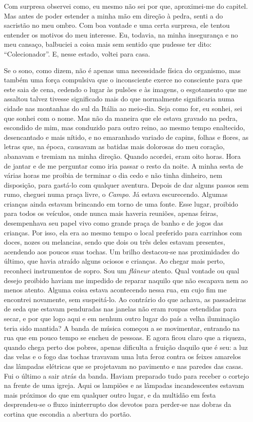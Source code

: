 Com surpresa observei como, eu mesmo não sei por que, aproximei-me do
capitel. Mas antes de poder estender a minha mão em direção à pedra,
senti a do sacristão no meu ombro. Com boa vontade e uma certa surpresa,
ele tentou entender os motivos do meu interesse. Eu, todavia, na minha
insegurança e no meu cansaço, balbuciei a coisa mais sem sentido que
pudesse ter dito: ``Colecionador''. E, nesse estado, voltei para casa.

Se o sono, como dizem, não é apenas uma necessidade física do organismo,
mas também uma força compulsiva que o inconsciente exerce no consciente
para que este saia de cena, cedendo o lugar às pulsões e às imagens, o
esgotamento que me assaltou talvez tivesse significado mais do que
normalmente significaria numa cidade nas montanhas do sul da Itália ao
meio-dia. Seja como for, eu sonhei, sei que sonhei com o nome. Mas não
da maneira que ele estava gravado na pedra, escondido de mim, mas
conduzido para outro reino, ao mesmo tempo enaltecido, desencantado e
mais nítido, e no emaranhado variado de capins, folhas e flores, as
letras que, na época, causavam as batidas mais dolorosas do meu coração,
abanavam e tremiam na minha direção. Quando acordei, eram oito horas.
Hora de jantar e de me perguntar como iria passar o resto da noite. A
minha sesta de várias horas me proibia de terminar o dia cedo e não
tinha dinheiro, nem disposição, para gastá-lo com qualquer aventura.
Depois de dar alguns passos sem rumo, cheguei numa praça livre, o
\emph{Campo}. Já estava escurecendo. Algumas crianças ainda estavam
brincando em torno de uma fonte. Esse lugar, proibido para todos os
veículos, onde nunca mais haveria reuniões, apenas feiras, desempenhava
seu papel vivo como grande praça de banho e de jogos das crianças. Por
isso, ela era ao mesmo tempo o local preferido para carrinhos com doces,
nozes ou melancias, sendo que dois ou três deles estavam presentes,
acendendo aos poucos suas tochas. Um brilho destacou-se nas proximidades
do último, que havia atraído alguns ociosos e crianças. Ao chegar mais
perto, reconheci instrumentos de sopro. Sou um \emph{flâneur} atento.
Qual vontade ou qual desejo proibido haviam me impedido de reparar
naquilo que não escapava nem ao menos atento. Alguma coisa estava
acontecendo nessa rua, em cujo fim me encontrei novamente, sem
suspeitá-lo. Ao contrário do que achava, as passadeiras de seda que
estavam penduradas nas janelas não eram roupas estendidas para secar, e
por que logo aqui e em nenhum outro lugar do país a velha iluminação
teria sido mantida? A banda de música começou a se movimentar, entrando
na rua que em pouco tempo se encheu de pessoas. E agora ficou claro que
a riqueza, quando chega perto dos pobres, apenas dificulta a fruição
daquilo que é seu: a luz das velas e o fogo das tochas travavam uma luta
feroz contra os feixes amarelos das lâmpadas elétricas que se projetavam
no pavimento e nas paredes das casas. Fui o último a sair atrás da
banda. Haviam preparado tudo para receber o cortejo na frente de uma
igreja. Aqui os lampiões e as lâmpadas incandescentes estavam mais
próximos do que em qualquer outro lugar, e da multidão em festa
desprendeu-se o fluxo ininterrupto dos devotos para perder-se nas dobras
da cortina que escondia a abertura do portão.

